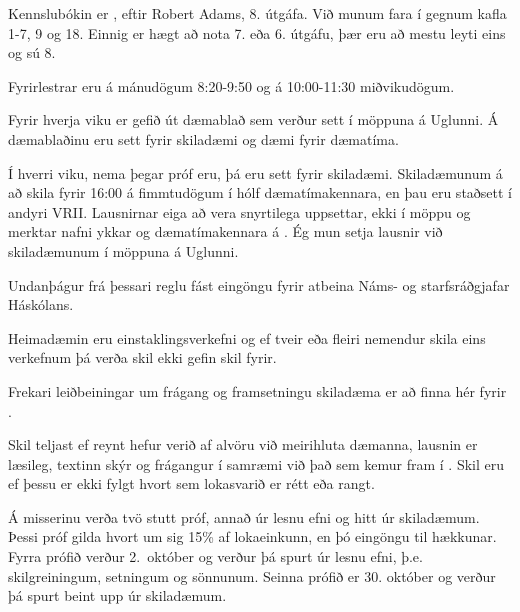 \documentclass[a4paper,10pt,icelandic]{sphinxmanual}
\begin{document}
 Kennslubókin er , eftir
Robert Adams, 8. útgáfa. Við munum fara í gegnum kafla 1-7, 9 og
18. Einnig er hægt að nota 7. eða 6. útgáfu, þær eru að mestu leyti eins og sú 8.

 Fyrirlestrar eru á mánudögum 8:20-9:50 og á
10:00-11:30 miðvikudögum.

 Fyrir hverja viku er gefið út dæmablað sem
verður sett í  möppuna á Uglunni. Á dæmablaðinu eru sett fyrir
skiladæmi og dæmi fyrir dæmatíma.

 Í hverri viku, nema þegar próf eru, þá eru sett fyrir
skiladæmi. Skiladæmunum á að skila fyrir 16:00 á fimmtudögum í hólf
dæmatímakennara, en þau eru staðsett í andyri VRII. Lausnirnar eiga að
vera snyrtilega uppsettar, ekki í möppu og merktar nafni ykkar og
dæmatímakennara á . Ég mun setja lausnir við
skiladæmunum í möppuna  á Uglunni.

\begin{center}
\end{center}
Undanþágur frá þessari reglu fást eingöngu fyrir atbeina Náms- og starfsráðgjafar Háskólans.

Heimadæmin eru einstaklingsverkefni og ef tveir eða fleiri nemendur skila
eins verkefnum þá verða skil ekki gefin skil fyrir.

Frekari leiðbeiningar um frágang og framsetningu skiladæma er að finna
hér fyrir {\hyperref[\detokenize{vidauki:fragangurskiladaema}]{}}.

Skil teljast  ef reynt hefur verið af alvöru við meirihluta
dæmanna, lausnin er læsileg, textinn skýr og frágangur í samræmi við það sem
kemur fram í {\hyperref[\detokenize{vidauki:fragangurskiladaema}]{}}.
Skil eru  ef þessu er ekki fylgt hvort sem
lokasvarið er rétt eða rangt.

 Á misserinu verða tvö stutt próf, annað úr lesnu efni og
hitt úr skiladæmum. Þessi próf gilda hvort um sig 15\% af lokaeinkunn, en
þó eingöngu til hækkunar. Fyrra prófið verður 2. október og verður þá
spurt úr lesnu efni, þ.e. skilgreiningum, setningum og sönnunum. Seinna
prófið er 30. október og verður þá spurt beint upp úr skiladæmum.
\end{document}
